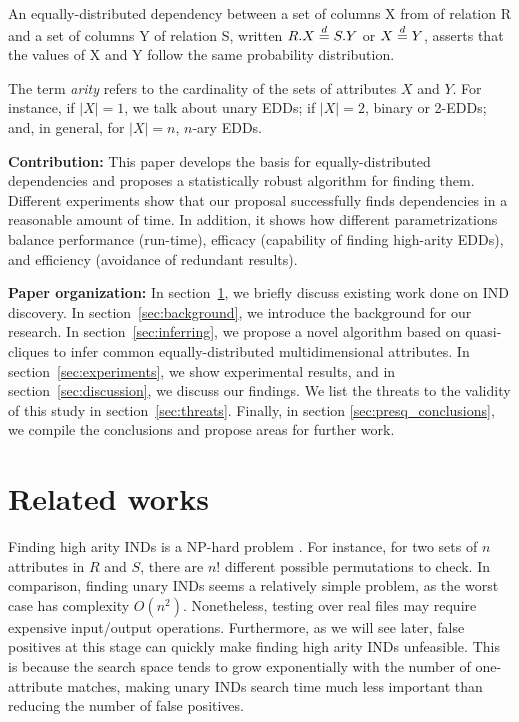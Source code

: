 \begin{displayquote}
An equally-distributed dependency between a set of columns X from
of relation R and a set of columns Y of relation S, written $R.X \stackrel{d}{=} S.Y$ or
$X \stackrel{d}{=} Y$, asserts that the values of X and Y follow the same probability distribution.
\end{displayquote}

The term \emph{arity} refers to the cardinality of the sets of attributes $X$ and $Y$. For instance, if $|X| = 1$, we talk about unary EDDs; if $|X| = 2$,
binary or 2-EDDs; and, in general, for $|X| = n$, $n$-ary EDDs.

\textbf{Contribution:} This paper develops the basis for equally-distributed
dependencies and proposes a statistically robust algorithm for finding them.
Different experiments show that our proposal successfully finds dependencies in a
reasonable amount of time. In addition, it shows how different parametrizations balance performance
(run-time), efficacy (capability of finding high-arity EDDs), and efficiency (avoidance of
redundant results).

\textbf{Paper organization:} In section~\ref{sec:literature_review}, we briefly discuss
existing work done on IND discovery.
In section~\ref{sec:background}, we introduce the background for our research. 
In section~\ref{sec:inferring}, we propose a novel algorithm based on quasi-cliques
to infer common equally-distributed multidimensional attributes.
In section~\ref{sec:experiments}, we show experimental results, and in
section~\ref{sec:discussion}, we discuss our findings. We list the
threats to the validity of this study in section~\ref{sec:threats}. Finally, in section
\ref{sec:presq_conclusions}, we compile the conclusions and propose areas for
further work.


\section{Related works}
\label{sec:literature_review}

Finding high arity INDs is a NP-hard problem \cite{kantola1992}.
For instance, for two sets of $n$ attributes in $R$ and $S$,
there are $n!$ different possible permutations to check.
In comparison, finding unary INDs seems a relatively simple problem,
as the worst case has complexity $O(n^2)$. Nonetheless,
testing over real files may require expensive input/output operations.
Furthermore, as we will see later, false positives at this stage can quickly make
finding high arity INDs unfeasible. This is because the search space tends to grow exponentially
with the number of one-attribute matches, making unary INDs search time much less important
than reducing the number of false positives.

